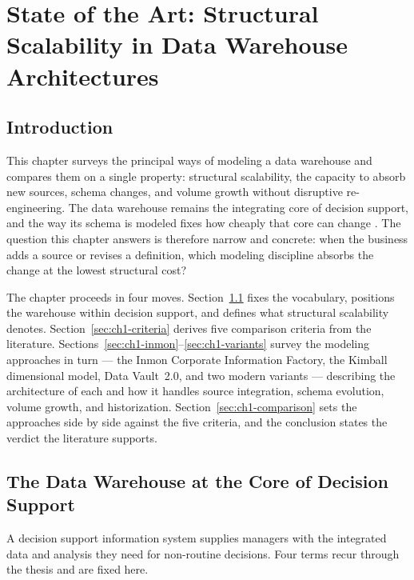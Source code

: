 \chapter{State of the Art: Structural Scalability in Data Warehouse Architectures}

\section*{Introduction}

This chapter surveys the principal ways of modeling a data warehouse and compares them on a single property: structural scalability, the capacity to absorb new sources, schema changes, and volume growth without disruptive re-engineering. The data warehouse remains the integrating core of decision support, and the way its schema is modeled fixes how cheaply that core can change \parencite{inmon2005, kimball2013}. The question this chapter answers is therefore narrow and concrete: when the business adds a source or revises a definition, which modeling discipline absorbs the change at the lowest structural cost?

The chapter proceeds in four moves. Section~\ref{sec:ch1-dw-core} fixes the vocabulary, positions the warehouse within decision support, and defines what structural scalability denotes. Section~\ref{sec:ch1-criteria} derives five comparison criteria from the literature. Sections~\ref{sec:ch1-inmon}--\ref{sec:ch1-variants} survey the modeling approaches in turn --- the Inmon Corporate Information Factory, the Kimball dimensional model, Data Vault~2.0, and two modern variants --- describing the architecture of each and how it handles source integration, schema evolution, volume growth, and historization. Section~\ref{sec:ch1-comparison} sets the approaches side by side against the five criteria, and the conclusion states the verdict the literature supports.

\section{The Data Warehouse at the Core of Decision Support}
\label{sec:ch1-dw-core}

A decision support information system supplies managers with the integrated data and analysis they need for non-routine decisions. Four terms recur through the thesis and are fixed here.

